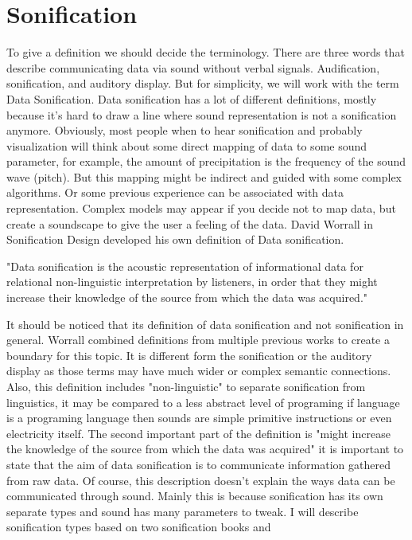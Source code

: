 \chapter{Sonification}
To give a definition we should decide the terminology. There are three words that describe communicating data via sound without verbal signals. Audification, sonification, and auditory display. But for simplicity, we will work with the term Data Sonification. 
Data sonification has a lot of different definitions, mostly because it's hard to draw a line where sound representation is not a sonification anymore. 
Obviously, most people when to hear sonification and probably visualization will think about some direct mapping of data to some sound parameter, for example, the amount of precipitation is the frequency of the sound wave (pitch). But this mapping might be indirect and guided with some complex algorithms.
Or some previous experience can be associated with data representation. Complex models may appear if you decide not to map data, but create a soundscape to give the user a feeling of the data. 
David Worrall in Sonification Design developed his own definition of Data sonification. 
\begin{displayquote}
    "Data sonification is the acoustic representation of informational data for
relational non-linguistic interpretation by listeners, in order that they might
increase their knowledge of the source from which the data was acquired." \cite{Worrall}
\end{displayquote}
It should be noticed that its definition of data sonification and not sonification in general. Worrall combined definitions from multiple previous works to create a boundary for this topic. It is different form the sonification or the auditory display as those terms may have much wider or complex semantic connections. Also, this definition includes "non-linguistic" to separate sonification from linguistics, it may be compared to a less abstract level of programing if language is a programing language then sounds are simple primitive instructions or even electricity itself. The second important part of the definition is "might increase the knowledge of the source from which the data was acquired" it is important to state that the aim of data sonification is to communicate information gathered from raw data. Of course, this description doesn't explain the ways data can be communicated through sound. Mainly this is because sonification has its own separate types and sound has many parameters to tweak.
I will describe sonification types based on two sonification books \cite{Worrall} and \cite{Hermann}